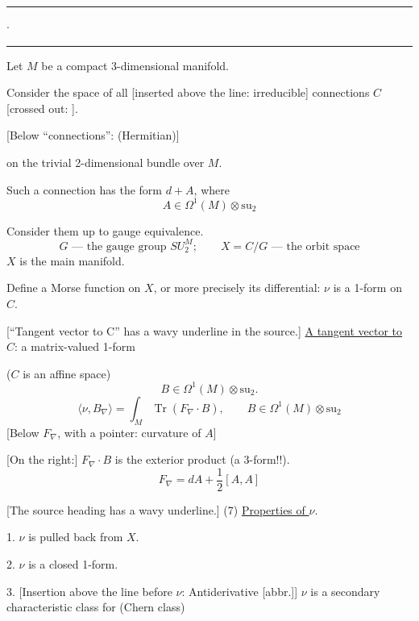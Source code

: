 \begin{center}
\rule{12mm}{0.4pt}\quad$\cdot$\quad\rule{12mm}{0.4pt}
\end{center}

Let $M$ be a compact 3-dimensional manifold.

Consider the space of all [inserted above the line: irreducible] connections $C$
[crossed out: ].

[Below “connections”: (Hermitian)]

on the trivial 2-dimensional bundle over $M$.

Such a connection has the form $d+A$, where
\begin{equation*}
A\in\Omega^1(M)\otimes\mathrm{su}_2
\end{equation*}

Consider them up to gauge equivalence.
\begin{equation*}
G\text{ --- the gauge group }SU_2^M;\qquad
X=C/G\text{ --- the orbit space}
\end{equation*}
$X$ is the main manifold.

Define a Morse function on $X$, or more precisely its differential:
$\nu$ is a 1-form on $C$.

[“Tangent vector to C” has a wavy underline in the source.]
\underline{A tangent vector to $C$}: a matrix-valued 1-form

($C$ is an affine space)
\begin{equation*}
B\in\Omega^1(M)\otimes\mathrm{su}_2.
\end{equation*}
\begin{equation*}
\langle\nu,B_\nabla\rangle
=\int_M\operatorname{Tr}(F_\nabla\cdot B),
\qquad B\in\Omega^1(M)\otimes\mathrm{su}_2
\tag{5}
\end{equation*}
[Below $F_\nabla$, with a pointer: curvature of $A$]

[On the right:] $F_\nabla\cdot B$ is the exterior product (a 3-form!!).
\begin{equation*}
F_\nabla=dA+\frac{1}{2}[A,A]
\tag{6}
\end{equation*}

[The source heading has a wavy underline.]
(7) \underline{Properties of $\nu$}.

1. $\nu$ is pulled back from $X$.

2. $\nu$ is a closed 1-form.

3. [Insertion above the line before $\nu$: Antiderivative [abbr.]] $\nu$ is a secondary characteristic class for
 (Chern class)

